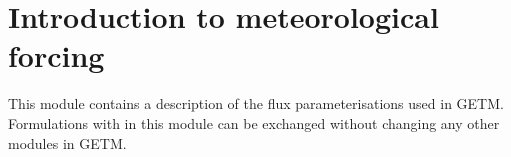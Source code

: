 \section{Introduction to meteorological forcing}

This module contains a description of the flux parameterisations
used in GETM. Formulations with in this module can be exchanged 
without changing any other modules in GETM.
